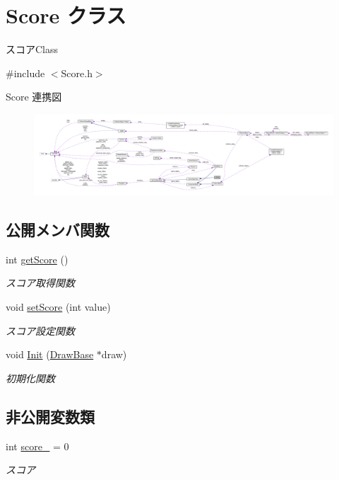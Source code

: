 \hypertarget{class_score}{}\section{Score クラス}
\label{class_score}


スコア\+Class  




{\ttfamily \#include $<$Score.\+h$>$}



Score 連携図\nopagebreak
\begin{figure}[H]
\begin{center}
\leavevmode
\includegraphics[width=350pt]{class_score__coll__graph}
\end{center}
\end{figure}
\subsection*{公開メンバ関数}
\begin{DoxyCompactItemize}
\item 
int \mbox{\hyperlink{class_score_a8627c93270c188a3fd28a25b1d07a9e7}{get\+Score}} ()
\begin{DoxyCompactList}\small\item\em スコア取得関数 \end{DoxyCompactList}\item 
void \mbox{\hyperlink{class_score_a11cc65a5d91bb14d62a364150565972d}{set\+Score}} (int value)
\begin{DoxyCompactList}\small\item\em スコア設定関数 \end{DoxyCompactList}\item 
void \mbox{\hyperlink{class_score_ab75a9a16b40fc6e424740db1ff6f1917}{Init}} (\mbox{\hyperlink{class_draw_base}{Draw\+Base}} $\ast$draw)
\begin{DoxyCompactList}\small\item\em 初期化関数 \end{DoxyCompactList}\end{DoxyCompactItemize}
\subsection*{非公開変数類}
\begin{DoxyCompactItemize}
\item 
int \mbox{\hyperlink{class_score_acaeda7737ddfbd4401adf960d3975d74}{score\+\_\+}} = 0
\begin{DoxyCompactList}\small\item\em スコア \end{DoxyCompactList}\end{DoxyCompactItemize}
